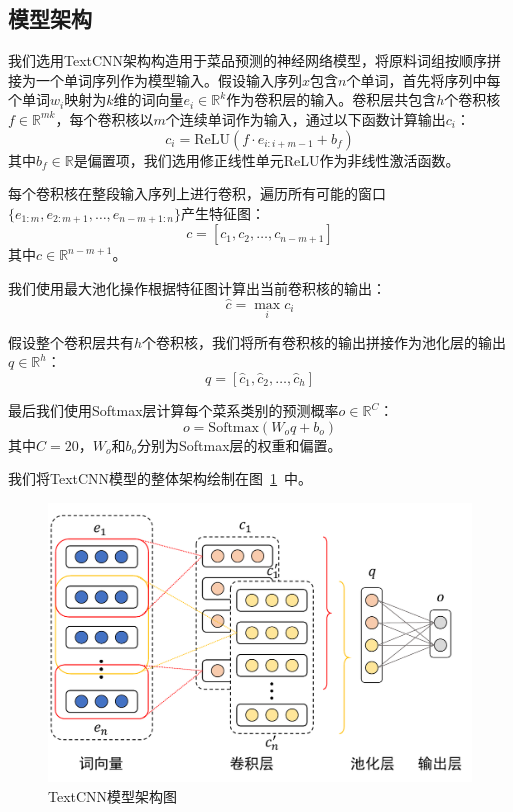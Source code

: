 \subsection{模型架构}

我们选用TextCNN架构\cite{kim2014convolutional}构造用于菜品预测的神经网络模型，将原料词组按顺序拼接为一个单词序列作为模型输入。假设输入序列$x$包含$n$个单词，首先将序列中每个单词$w_i$映射为$k$维的词向量$e_i\in\mathbb{R}^k$作为卷积层的输入。卷积层共包含$h$个卷积核$f\in\mathbb{R}^{mk}$，每个卷积核以$m$个连续单词作为输入，通过以下函数计算输出$c_i$：
\begin{equation}
    c_i=\text{ReLU}(f\cdot e_{i:i+m-1}+b_f)
\end{equation}
其中$b_f\in\mathbb{R}$是偏置项，我们选用修正线性单元ReLU作为非线性激活函数。

每个卷积核在整段输入序列上进行卷积，遍历所有可能的窗口$\{e_{1:m},e_{2:m+1},\ldots,e_{n-m+1:n}\}$产生特征图：
\begin{equation}
    c=[c_1,c_2,\ldots,c_{n-m+1}]
\end{equation}
其中$c\in\mathbb{R}^{n-m+1}$。

我们使用最大池化操作根据特征图计算出当前卷积核的输出：
\begin{equation}
    \hat{c}=\max_i c_i
\end{equation}

假设整个卷积层共有$h$个卷积核，我们将所有卷积核的输出拼接作为池化层的输出$q\in\mathbb{R}^h$：
\begin{equation}
    q=[\hat{c}_1,\hat{c}_2,\ldots,\hat{c}_h]
\end{equation}

最后我们使用Softmax层计算每个菜系类别的预测概率$o\in\mathbb{R}^C$：
\begin{equation}
    o=\text{Softmax}(W_oq+b_o)
\end{equation}
其中$C=20$，$W_o$和$b_o$分别为Softmax层的权重和偏置。

我们将TextCNN模型的整体架构绘制在图~\ref{fig:model}~中。

\begin{figure}[htbp]
    \centering
    \includegraphics[width=.6\textwidth]{figs/textcnn.pdf}
    \caption{TextCNN模型架构图}
    \label{fig:model}
\end{figure}

